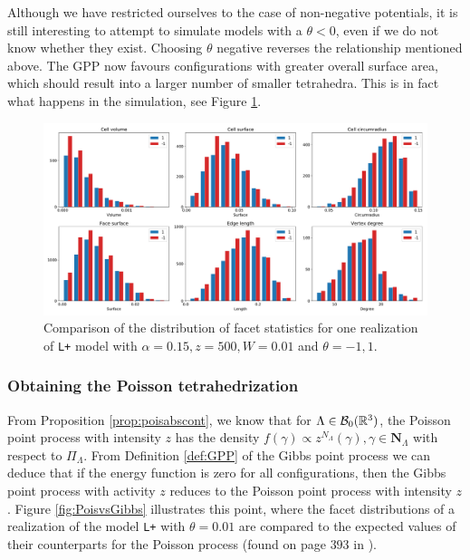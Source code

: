 Although we have restricted ourselves to the case of non-negative potentials, it is still interesting to attempt to simulate models with a $\theta<0$, even if we do not know whether they exist. Choosing $\theta$ negative reverses the relationship mentioned above. The GPP now favours configurations with greater overall surface area, which should result into a larger number of smaller tetrahedra. This is in fact what happens in the simulation, see Figure \ref{fig:thetanegative}.


\begin{figure}
  \centering
    \includegraphics[width=1\textwidth]{../img/numeric/facets_1_-1.pdf}
  \caption{Comparison of the distribution of facet statistics for one realization of \texttt{L+} model with $\alpha=0.15,z=500,W=0.01$ and $\theta = -1,1$.  }
  \label{fig:thetanegative}
\end{figure}




\subsubsection{Obtaining the Poisson tetrahedrization}
From Proposition \ref{prop:poisabscont}, we know that for $\Lambda \in \mathcal B_0({\mathbb R^3})$, the Poisson point process with intensity $z$ has the density $f(\gamma)\propto z^{N_\Lambda}(\gamma), \gamma \in \mathbf N_\Lambda$  with respect to $\Pi_\Lambda$. From Definition \ref{def:GPP} of the Gibbs point process we can deduce that if the energy function is zero for all configurations, then the Gibbs point process with activity $z$ reduces to the Poisson point process with intensity $z$.  Figure \ref{fig:PoisvsGibbs} illustrates this point, where the facet distributions of a realization of the model \texttt{L+} with $\theta=0.01$ are compared to the expected values of their counterparts for the Poisson process (found on page $393$ in \cite{Okabe1992}).

